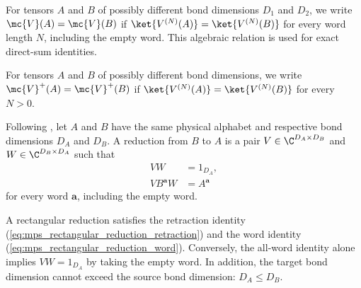 \begin{definition}\label{def:same_mpv2}
    \leanok
    For tensors $A$ and $B$ of possibly different bond
    dimensions $D_1$ and $D_2$,
    we write $\mc{V}(A) = \mc{V}(B)$ if
    $\ket{V^{(N)}(A)} = \ket{V^{(N)}(B)}$ for every word length $N$,
    including the empty word. This algebraic relation is used for exact
    direct-sum identities.
\end{definition}

\begin{definition}%
    \label{def:same_mpv2_pos}
    \leanok
    For tensors $A$ and $B$ of possibly different bond dimensions,
    we write $\mc{V}^+(A) = \mc{V}^+(B)$ if
    $\ket{V^{(N)}(A)} = \ket{V^{(N)}(B)}$ for every $N > 0$.
\end{definition}

\begin{definition}
    \label{def:mps_rectangular_reduction}
    \leanok
    Following \cite[Proposition~20 and the following definition]{Molnar2018SemiInjective},
    let $A$ and $B$ have the same physical alphabet and respective bond
    dimensions $D_A$ and $D_B$. A reduction from $B$ to $A$ is a pair
    $V\in\C^{D_A\times D_B}$ and
    $W\in\C^{D_B\times D_A}$ such that
    \begin{align}
        VW              & =1_{D_A},
        \label{eq:mps_rectangular_reduction_retraction} \\
        VB^{\mathbf a}W & =A^{\mathbf a}
        \label{eq:mps_rectangular_reduction_word}
    \end{align}
    for every word $\mathbf a$, including the empty word.
\end{definition}

\begin{lemma}
    \label{thm:mps_rectangular_reduction_identities}
    \leanok
    A rectangular reduction satisfies the retraction identity
    (\ref{eq:mps_rectangular_reduction_retraction}) and the word identity
    (\ref{eq:mps_rectangular_reduction_word}).  Conversely, the all-word
    identity alone implies $VW=1_{D_A}$ by taking the empty word.  In addition,
    the target bond dimension cannot exceed the source bond dimension:
    $D_A\leq D_B$.
\end{lemma}

